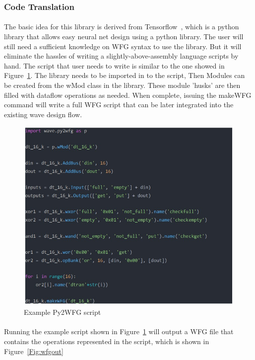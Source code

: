 \subsubsection*{Code Translation}
\paragraph{}
The basic idea for this library is derived from Tensorflow~\cite{tflow}, which is a python library that allows easy neural net design using a python library. The user will still need a sufficient knowledge on WFG syntax to use the library. But it will eliminate the hassles of writing a slightly-above-assembly language scripts by hand. The script that user needs to write is similar to the one showed in Figure~\ref{Fig:py2eg}. The library needs to be imported in to the script, Then Modules can be created from the wMod class in the library. These module 'husks' are then filled with dataflow operations as needed. When complete, issuing the makeWFG command will write a full WFG script that can be later integrated into the existing wave design flow.

\begin{figure}[h]
    \centering
    \includegraphics[trim=0cm 0cm 0cm 0cm, clip=true,scale=0.7]{figures/py2wfg_eg.jpg}
    \caption{Example Py2WFG script\label{Fig:py2eg}}\vspace{-4mm}
    \end{figure}

\paragraph{}
Running the example script shown in Figure~\ref{Fig:py2eg} will output a WFG file that contains the operations represented in the script, which is shown in Figure~\ref{Fig:wfgout}

